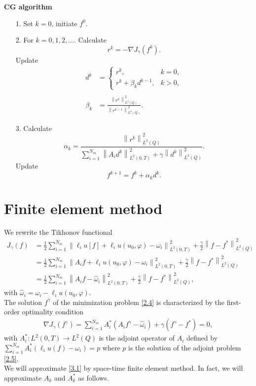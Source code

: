\documentclass[]{article}
\begin{document}
\noindent \textbf{CG algorithm}
\begin{itemize}
	\item[1.] Set $k=0$, initiate $f^0$.
	\item[2.] For $k=0, 1, 2,...$. Calculate
	$$r^k=-\nabla J_\gamma(f^k).$$
	Update\\
	\begin{align*}
		d^k&=\left\{\begin{array}{ll}
		r^k,& k=0,\\
		r^k+\beta_kd^{k-1},& k>0,
		\end{array}\right.\\\\
		\beta_k&=\frac{\left\|r^k\right\|^2_{L^2(Q)}}{\left\|r^{k-1}\right\|^2_{L^2(Q)}}.
	\end{align*}
	\item[3.] Calculate
	$$\alpha_k=\frac{\left\|r^k\right\|^2_{L^2(Q)}}{\displaystyle\sum_{i=1}^{N_m}\left\|A_id^k\right\|^2_{L^2(0, T)}+\gamma\left\|d^k\right\|^2_{L^2(Q)}}.$$
	Update
	$$f^{k+1}=f^{k}+\alpha_kd^k.$$
\end{itemize}

\section{Finite element method}
We rewrite the Tikhonov functional
\begin{align*}
	J_\gamma(f)&=\frac{1}{2}\sum_{i=1}^{N_m}\left\|\ell_i u[f]+\ell_i u(u_0, \varphi)-\omega_i\right\|^2_{L^2(0, T)}+\frac{\gamma}{2}\left\|f-f^*\right\|^2_{L^2(Q)}\\
	&=\frac{1}{2}\sum_{i=1}^{N_m}\left\|A_if+\ell_i u(u_0, \varphi)-\omega_i\right\|^2_{L^2(0, T)}+\frac{\gamma}{2}\left\|f-f^*\right\|^2_{L^2(Q)}\\
	&=\frac{1}{2}\sum_{i=1}^{N_m}\left\|A_if-\hat{\omega}_i\right\|^2_{L^2(0, T)}+\frac{\gamma}{2}\left\|f-f^*\right\|^2_{L^2(Q)},
\end{align*}
with $\hat{\omega}_i=\omega_i-\ell_i u(u_0, \varphi)$.
\\
The solution $f^\gamma$ of the minimization problem \eqref{2.4} is characterized by the first-order optimality condition
\begin{align}\label{3.1}
	\nabla J_\gamma(f^\gamma)= \sum_{i=1}^{N_m}A^*_i(A_if^\gamma-\hat{\omega}_i)+\gamma(f^\gamma-f^*)=0,
\end{align}
with $A_i^*: L^2(0, T)\to L^2(Q)$ is the adjoint operator of $A_i$ defined by $\sum_{i=1}^{N_m}A_i^*\left(\ell_i u(f) - \omega_i\right) = p$ where $p$ is the solution of the adjoint problem \eqref{2.5}. 
\\
We will approximate \eqref{3.1} by space-time finite element method. In fact, we will approximate $A_k$ and $A^*_k$ as follows.
\end{document}
